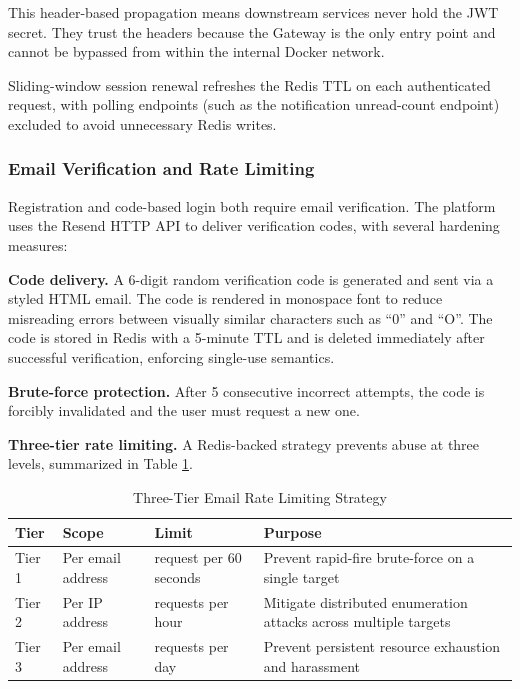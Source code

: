 This header-based propagation means downstream services never hold the JWT secret. They trust the headers because the Gateway is the only entry point and cannot be bypassed from within the internal Docker network.

Sliding-window session renewal refreshes the Redis TTL on each authenticated request, with polling endpoints (such as the notification unread-count endpoint) excluded to avoid unnecessary Redis writes.

\subsubsection{Email Verification and Rate Limiting}

Registration and code-based login both require email verification. The platform uses the Resend HTTP API to deliver verification codes, with several hardening measures:

\textbf{Code delivery.} A 6-digit random verification code is generated and sent via a styled HTML email. The code is rendered in monospace font to reduce misreading errors between visually similar characters such as ``0'' and ``O''. The code is stored in Redis with a 5-minute TTL and is deleted immediately after successful verification, enforcing single-use semantics.

\textbf{Brute-force protection.} After 5 consecutive incorrect attempts, the code is forcibly invalidated and the user must request a new one.

\textbf{Three-tier rate limiting.} A Redis-backed strategy prevents abuse at three levels, summarized in Table \ref{tab:rate-limiting}.

\begin{table}[H]
\centering
\small\singlespacing
\caption{Three-Tier Email Rate Limiting Strategy}
\label{tab:rate-limiting}
\begin{tabularx}{\textwidth}{>{\RaggedRight\arraybackslash}p{}>{\RaggedRight\arraybackslash}p{}>{\RaggedRight\arraybackslash}p{}>{\RaggedRight\arraybackslash}X}
\toprule
\textbf{Tier} & \textbf{Scope} & \textbf{Limit} & \textbf{Purpose} \\
\midrule
Tier 1 & Per email address & 1 request per 60 seconds & Prevent rapid-fire brute-force on a single target \\
Tier 2 & Per IP address & 5 requests per hour & Mitigate distributed enumeration attacks across multiple targets \\
Tier 3 & Per email address & 10 requests per day & Prevent persistent resource exhaustion and harassment \\
\bottomrule
\end{tabularx}
\end{table}


